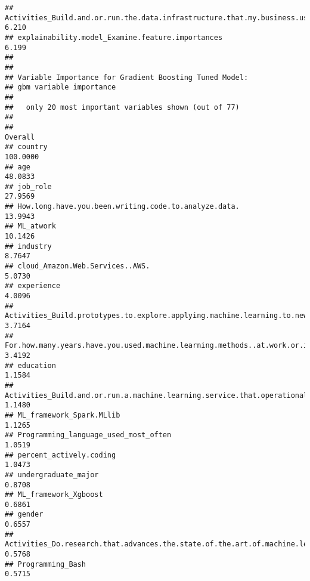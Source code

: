 \documentclass[
]{article}
\begin{document}
\begin{verbatim}
## Activities_Build.and.or.run.the.data.infrastructure.that.my.business.uses.for.storing..analyzing..and.operationalizing.data   6.210
## explainability.model_Examine.feature.importances                                                                              6.199
## 
## 
## Variable Importance for Gradient Boosting Tuned Model:
## gbm variable importance
## 
##   only 20 most important variables shown (out of 77)
## 
##                                                                                                             Overall
## country                                                                                                    100.0000
## age                                                                                                         48.0833
## job_role                                                                                                    27.9569
## How.long.have.you.been.writing.code.to.analyze.data.                                                        13.9943
## ML_atwork                                                                                                   10.1426
## industry                                                                                                     8.7647
## cloud_Amazon.Web.Services..AWS.                                                                              5.0730
## experience                                                                                                   4.0096
## Activities_Build.prototypes.to.explore.applying.machine.learning.to.new.areas                                3.7164
## For.how.many.years.have.you.used.machine.learning.methods..at.work.or.in.school..                            3.4192
## education                                                                                                    1.1584
## Activities_Build.and.or.run.a.machine.learning.service.that.operationally.improves.my.product.or.workflows   1.1480
## ML_framework_Spark.MLlib                                                                                     1.1265
## Programming_language_used_most_often                                                                         1.0519
## percent_actively.coding                                                                                      1.0473
## undergraduate_major                                                                                          0.8708
## ML_framework_Xgboost                                                                                         0.6861
## gender                                                                                                       0.6557
## Activities_Do.research.that.advances.the.state.of.the.art.of.machine.learning                                0.5768
## Programming_Bash                                                                                             0.5715
\end{verbatim}
\end{document}
